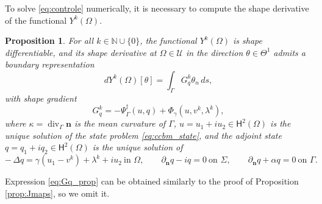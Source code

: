 \documentclass[a4paper,11pt]{article}
\newtheorem{proposition}[theorem]{Proposition}
\newcommand{\vect}[1]{\boldsymbol{\mathbf{#1}}}
\newcommand{\tannabla}{\nabla_{\varGamma}}
\newcommand{\tandive}{\operatorname{div}_{\varGamma}}
\newcommand{\ur}{u_{1}}
\newcommand{\ui}{u_{2}}
\newcommand{\qr}{q_{1}}
\newcommand{\qi}{q_{2}}
\newcommand{\GG}{G} %
\newcommand{\sfTheta}{\Theta}
\newcommand{\HH}{\vect{\mathsf{H}}}
\newcommand{\VV}{\theta}
\newcommand{\Vn}{\theta_{n}}
\newcommand{\nn}{\vect{n}}
\newcommand{\dn}[1]{\partial_{\nn}{#1}}
\newcommand{\intG}[1]{\int_{\varGamma}{#1}{\, {d}{s}}}
\newcommand{\ADMMpara}{\gamma}
\begin{document}
To solve \eqref{eq:controle} numerically, it is necessary to compute the shape
derivative of the functional $Y^{k}(\varOmega)$.
%
%
%

\begin{proposition}
\label{prop:shape_gradient_Yk}
For all $k \in \mathbb{N} \cup \{0\}$, the functional $Y^{k}(\varOmega)$ is shape differentiable, and its shape derivative at $\varOmega \in \mathcal{U}$ in the direction $\VV \in \sfTheta^{1}$ admits a boundary representation 
%
\[
dY^k(\Omega)[\theta] = \intG{ \GG^{k}_q \Vn},
\]
%
with shape gradient
\begin{equation}
\label{eq:Gq_prop}
\GG^{k}_q
=
- \Psi^{\dagger}_{\varGamma}(u, q) 
+ 
\Phi_{\ADMMpara}(u, v^{k}, \lambda^{k}),
\end{equation}
%
where $\kappa=\tandive\nn$ is the mean curvature of $\varGamma$,
$u=\ur +i \ui \in\HH^{2}(\varOmega)$ is the unique solution of the state problem
\eqref{eq:ccbm_state}, and the adjoint state $q=\qr +i \qi \in \HH^{2}(\varOmega)$
is the unique solution of
\begin{equation}
\label{eq:adjoint_ADMM_prop_strong}
-\,\Delta q
=
\ADMMpara(\ur -v^{k})+\lambda^{k}
+i\ui 
\ \text{in } \varOmega,
\qquad
\dn q - i q = 0 \ \text{on } \varSigma,
\qquad
\dn q + \alpha q = 0 \ \text{on } \varGamma.
\end{equation}
\end{proposition}

Expression \eqref{eq:Gq_prop} can be obtained similarly to the proof of Proposition \ref{prop:Jmaps}, so we omit it.
\end{document}
